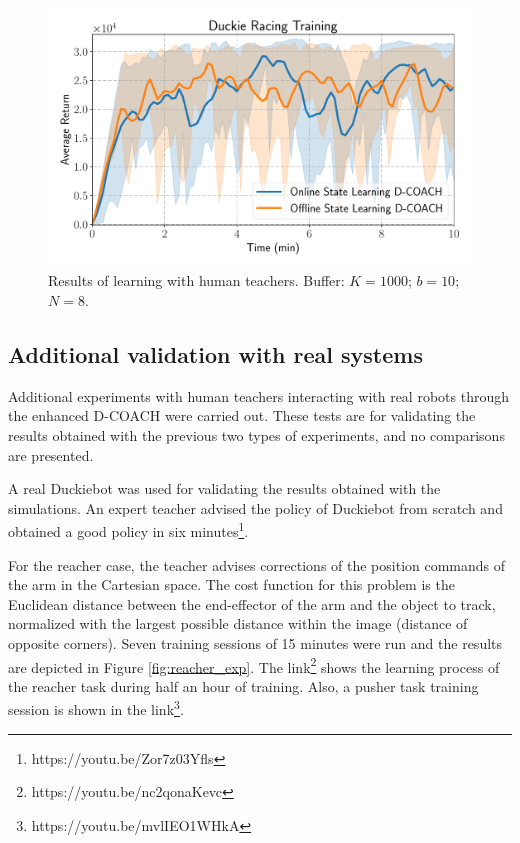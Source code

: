 \begin{figure}[h]
    \centering
    \includegraphics[width=0.9\linewidth]{imagenes/cap3/duckie_human_teacher_ICRA.pdf}
    \caption{Results of learning with human teachers. Buffer: $K = 1000$; $b = 10$; $N = 8$.}
    \label{fig:racing_car_results}
\end{figure}

\subsection{Additional validation with real systems}

Additional experiments with human teachers interacting with real robots through the enhanced D-COACH were carried out. These tests are for validating the results obtained with the previous two types of experiments, and no comparisons are presented.

A real Duckiebot was used for validating the results obtained with the simulations. An expert teacher advised the policy of Duckiebot from scratch and obtained a good policy in six minutes\footnote{https://youtu.be/Zor7z03Yfls}. 

For the reacher case, the teacher advises corrections of the position commands of the arm in the Cartesian space. The cost function for this problem is the Euclidean distance between the end-effector of the arm and the object to track, normalized with the largest possible distance within the image (distance of opposite corners). Seven training sessions of 15 minutes were run and the results are depicted in Figure \ref{fig:reacher_exp}. The link\footnote{https://youtu.be/nc2qonaKevc} shows the learning process of the reacher task during half an hour of training. Also, a pusher task training session is shown in the link\footnote{https://youtu.be/mvlIEO1WHkA}.

